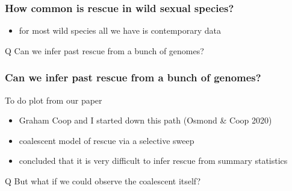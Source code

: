 \documentclass{beamer}
\begin{document}

\begin{frame}
	\frametitle{How common is rescue in wild sexual species?}

	\begin{itemize}
		\item for most wild species all we have is contemporary data \pause
	\end{itemize}

	\begin{block}{Q}
		Can we infer past rescue from a bunch of genomes?
	\end{block}

\end{frame}





\begin{frame}
	\frametitle{Can we infer past rescue from a bunch of genomes?}

	\begin{alertblock}{To do}
		plot from our paper
	\end{alertblock}

	\begin{itemize}
		\item Graham Coop and I started down this path (Osmond \& Coop 2020) \pause
		\item coalescent model of rescue via a selective sweep \pause
		\item concluded that it is very difficult to infer rescue from summary statistics \pause
	\end{itemize}

	\begin{block}{Q}
		But what if we could observe the coalescent itself?
	\end{block}

\end{frame}


\end{document}
